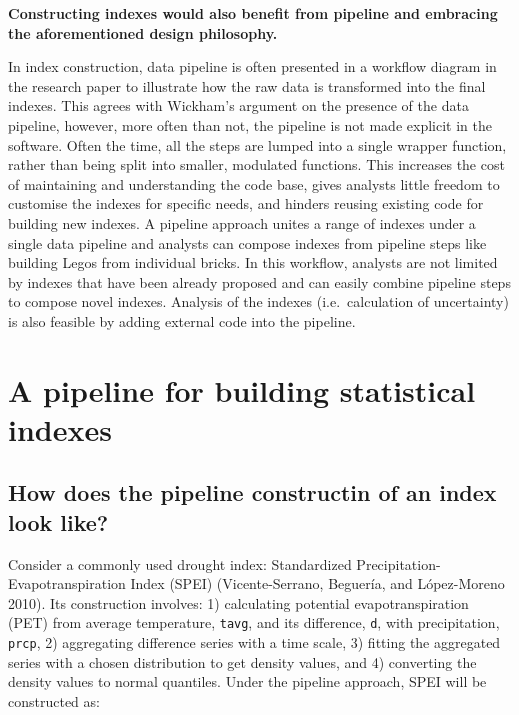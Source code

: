 \documentclass[
  letterpaper,
  DIV=11,
  numbers=noendperiod]{scrartcl}
\begin{document}
\textbf{Constructing indexes would also benefit from pipeline and
embracing the aforementioned design philosophy.}

In index construction, data pipeline is often presented in a workflow
diagram in the research paper to illustrate how the raw data is
transformed into the final indexes. This agrees with Wickham's argument
on the presence of the data pipeline, however, more often than not, the
pipeline is not made explicit in the software. Often the time, all the
steps are lumped into a single wrapper function, rather than being split
into smaller, modulated functions. This increases the cost of
maintaining and understanding the code base, gives analysts little
freedom to customise the indexes for specific needs, and hinders reusing
existing code for building new indexes. A pipeline approach unites a
range of indexes under a single data pipeline and analysts can compose
indexes from pipeline steps like building Legos from individual bricks.
In this workflow, analysts are not limited by indexes that have been
already proposed and can easily combine pipeline steps to compose novel
indexes. Analysis of the indexes (i.e.~calculation of uncertainty) is
also feasible by adding external code into the pipeline.

\hypertarget{sec-a-pipeline-for-building-statistical-indexes}{%
\section{A pipeline for building statistical
indexes}\label{sec-a-pipeline-for-building-statistical-indexes}}

\hypertarget{how-does-the-pipeline-constructin-of-an-index-look-like}{%
\subsection{How does the pipeline constructin of an index look
like?}\label{how-does-the-pipeline-constructin-of-an-index-look-like}}

Consider a commonly used drought index: Standardized
Precipitation-Evapotranspiration Index (SPEI) (Vicente-Serrano,
Beguería, and López-Moreno 2010). Its construction involves: 1)
calculating potential evapotranspiration (PET) from average temperature,
\texttt{tavg}, and its difference, \texttt{d}, with precipitation,
\texttt{prcp}, 2) aggregating difference series with a time scale, 3)
fitting the aggregated series with a chosen distribution to get density
values, and 4) converting the density values to normal quantiles. Under
the pipeline approach, SPEI will be constructed as:
\end{document}
